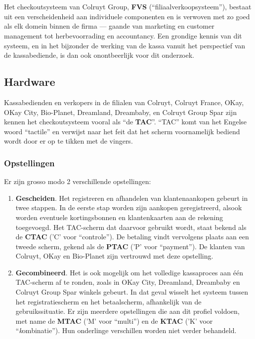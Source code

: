 
\chapter{}
\label{ch:functionele-omschrijving}

Het checkoutsysteem van Colruyt Group, \textbf{FVS} (``filiaalverkoopsysteem''), bestaat uit een verscheidenheid aan individuele componenten en is verwoven met zo goed als elk domein binnen de firma — gaande van marketing en customer management tot herbevoorrading en accountancy. Een grondige kennis van dit systeem, en in het bijzonder de werking van de kassa vanuit het perspectief van de kassabediende, is dan ook onontbeerlijk voor dit onderzoek.

\section{Hardware}

Kassabedienden en verkopers in de filialen van Colruyt, Colruyt France, OKay, OKay City, Bio-Planet, Dreamland, Dreambaby, en Colruyt Group Spar zijn kennen het checkoutsysteem vooral als ``de \textbf{TAC}''. ``TAC'' komt van het Engelse woord ``tactile'' en verwijst naar het feit dat het scherm voornamelijk bediend wordt door er op te tikken met de vingers.

\subsection{Opstellingen}

Er zijn grosso modo 2 verschillende opstellingen:

\begin{enumerate}
     \item \textbf{Gescheiden}. Het registreren en afhandelen van klantenaankopen gebeurt in twee stappen. In de eerste stap worden zijn aankopen geregistreerd, alsook worden eventuele kortingsbonnen en klantenkaarten aan de rekening toegevoegd. Het TAC-scherm dat daarvoor gebruikt wordt, staat bekend als de \textbf{CTAC} ('C' voor ``controle''). De betaling vindt vervolgens plaats aan een tweede scherm, gekend als de \textbf{PTAC} ('P' voor ``payment''). De klanten van Colruyt, OKay en Bio-Planet zijn vertrouwd met deze opstelling.
     \item \textbf{Gecombineerd}. Het is ook mogelijk om het volledige kassaproces aan één TAC-scherm af te ronden, zoals in OKay City, Dreamland, Dreambaby en Colruyt Group Spar winkels gebeurt. In dat geval wisselt het systeem tussen het registratiescherm en het betaalscherm, afhankelijk van de gebruikssituatie. Er zijn meerdere opstellingen die aan dit profiel voldoen, met name de \textbf{MTAC} ('M' voor ``multi'') en de \textbf{KTAC} ('K' voor ``\emph{k}ombinatie''). Hun onderlinge verschillen worden niet verder behandeld.
\end{enumerate}

